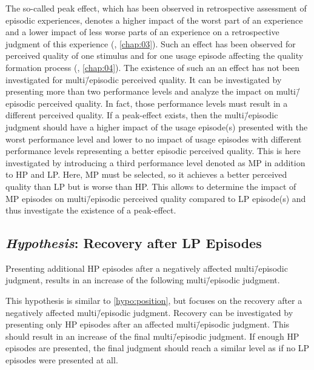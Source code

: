 The so-called peak effect, which has been observed in retrospective assessment of episodic experiences, denotes a higher impact of the worst part of an experience and a lower impact of less worse parts of an experience on a retrospective judgment of this experience (\cf, \autoref{chap:03}).
Such an effect has been observed for perceived quality of one stimulus and for one usage episode affecting the quality formation process (\cf, \autoref{chap:04}).
The existence of such an an effect has not been investigated for multi\=/episodic perceived quality.
It can be investigated by presenting more than two performance levels and analyze the impact on multi\=/episodic perceived quality.
In fact, those performance levels must result in a different perceived quality.
If a peak-effect exists, then the multi\=/episodic judgment should have a higher impact of the usage episode(s) presented with the worst performance level and lower to no impact of usage episodes with different performance levels representing a better episodic perceived quality.
This is here investigated by introducing a third performance level denoted as \ac{MP} in addition to \ac{HP} and \ac{LP}.
Here, \ac{MP} must be selected, so it achieves a better perceived quality than \ac{LP} but is worse than \ac{HP}.
This allows to determine the impact of \ac{MP} episodes on multi\=/episodic perceived quality compared to \ac{LP} episode(s) and thus investigate the existence of a peak-effect.



\subsection[H5: Recovery after \acs{LP} Episodes]{\emph{Hypothesis}: Recovery after \acs{LP} Episodes}
\begin{hypothesis}\label{hypo:recovery}
Presenting additional \ac{HP} episodes after a negatively affected multi\=/episodic judgment, results in an increase of the following multi\=/episodic judgment.
\end{hypothesis}

This hypothesis is similar to \autoref{hypo:position}, but focuses on the recovery after a negatively affected multi\=/episodic judgment.
Recovery can be investigated by presenting only \ac{HP} episodes after an affected multi\=/episodic judgment.
This should result in an increase of the final multi\=/episodic judgment.
If enough \ac{HP} episodes are presented, the final judgment should reach a similar level as if no \ac{LP} episodes were presented at all.

